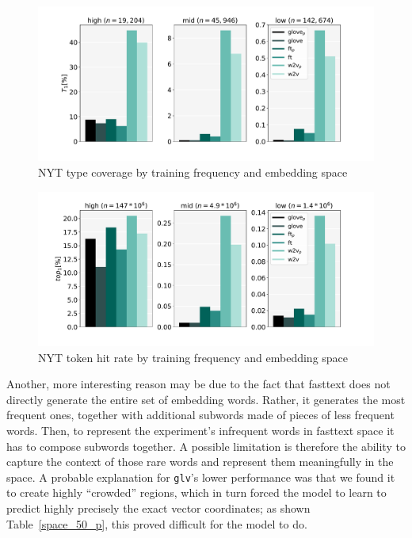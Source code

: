 \documentclass[11pt,a4paper]{article}
\begin{document}
 
\begin{figure}[h]
    \centering
    \includegraphics[width=0.47
    \textwidth]{fig/types_coverage_space_ny.pdf}
    \caption{NYT type coverage by training frequency and embedding space}
    \label{fig:type_coverage_space}
\end{figure}

\begin{figure}[h]
    \centering
    \includegraphics[width=0.47
    \textwidth]{fig/tokens_coverage_space_ny.pdf}
    \caption{NYT token hit rate by training frequency and embedding space}
    \label{fig:token_coverage_space}
\end{figure}

Another, more interesting reason may be due to the fact that fasttext does not directly generate the entire set of embedding words. Rather, it generates the most frequent ones, together with additional subwords made of pieces of less frequent words. 
Then, to represent the experiment's infrequent words in fasttext space it has to compose subwords together. 
A possible limitation is therefore the ability to capture the context of those rare words and represent them meaningfully in the space. 
A probable explanation for {\tt glv}'s lower performance was that we found it to create highly ``crowded'' regions, which in turn forced the model to learn to predict highly precisely the exact vector coordinates; as shown Table~\ref{space_50_p}, this proved difficult for the model to do.



\end{document}
